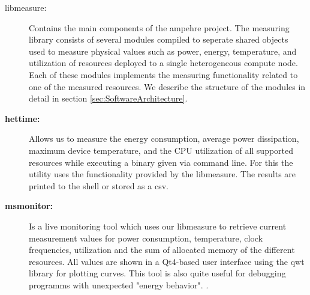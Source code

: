 \begin{description}
	\item[libmeasure:] Contains the main components of the ampehre project. The measuring library consists of several modules compiled to seperate shared objects used to measure physical values such as power, energy, temperature, and utilization of resources deployed to a single heterogeneous compute node. Each of these modules implements the measuring functionality related to one of the measured resources. We describe the structure of the modules in detail in section \ref{sec:SoftwareArchitecture}. 
% 	
	\item[\textbf{hettime:}] Allows us to measure the energy consumption, average power dissipation, maximum device temperature, and the CPU utilization of all supported resources while executing a binary given via command line. For this the utility uses the functionality provided by the libmeasure. The results are printed to the shell or stored as a csv.
	
	\item[\textbf{msmonitor:}] Is a live monitoring tool which uses our libmeasure to retrieve current measurement values for power consumption, temperature, clock frequencies, utilization and the sum of allocated memory of the different resources. All values are shown in a Qt4-based user interface using the qwt library for plotting curves.  This tool is also quite useful for debugging programms with unexpected "energy behavior". .
	

\end{description}

